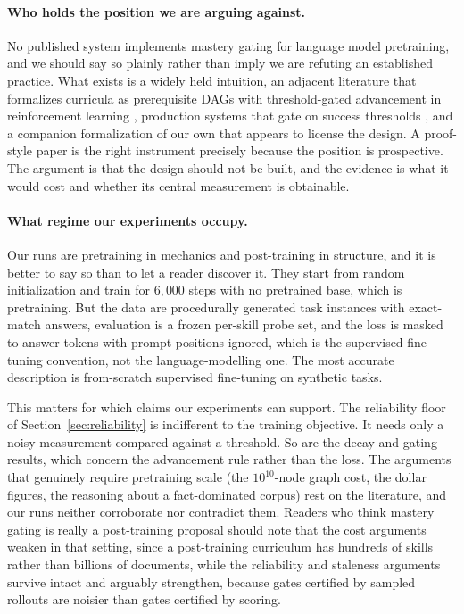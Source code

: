 \documentclass[11pt]{article}
\theoremstyle{plain}
\theoremstyle{definition}
\theoremstyle{remark}
\begin{document}
\paragraph{Who holds the position we are arguing against.} No published system
implements mastery gating for language model pretraining, and we should say so
plainly rather than imply we are refuting an established practice. What exists is
a widely held intuition, an adjacent literature that formalizes curricula as
prerequisite DAGs with threshold-gated advancement in reinforcement learning
\citep{narvekar2020curriculum,svetlik2017automatic}, production systems that gate
on success thresholds \citep{akkaya2019solving,openended2021xland}, and a
companion formalization of our own that appears to license the design. A
proof-style paper is the right instrument precisely because the position is
prospective. The argument is that the design should not be built, and the
evidence is what it would cost and whether its central measurement is
obtainable.

\paragraph{What regime our experiments occupy.} Our runs are pretraining in
mechanics and post-training in structure, and it is better to say so than to let
a reader discover it. They start from random initialization and train for
$6{,}000$ steps with no pretrained base, which is pretraining. But the data are
procedurally generated task instances with exact-match answers, evaluation is a
frozen per-skill probe set, and the loss is masked to answer tokens with prompt
positions ignored, which is the supervised fine-tuning convention, not the
language-modelling one. The most accurate description is from-scratch supervised
fine-tuning on synthetic tasks.

This matters for which claims our experiments can support. The reliability floor
of Section~\ref{sec:reliability} is indifferent to the training objective. It
needs only a noisy measurement compared against a threshold. So are the decay and
gating results, which concern the advancement rule rather than the loss. The
arguments that genuinely require pretraining scale (the $10^{10}$-node graph
cost, the dollar figures, the reasoning about a fact-dominated corpus) rest on
the literature, and our runs neither corroborate nor contradict them. Readers who
think mastery gating is really a post-training proposal should note that the
cost arguments weaken in that setting, since a post-training curriculum has
hundreds of skills rather than billions of documents, while the reliability and
staleness arguments survive intact and arguably strengthen, because gates
certified by sampled rollouts are noisier than gates certified by scoring.
\end{document}
